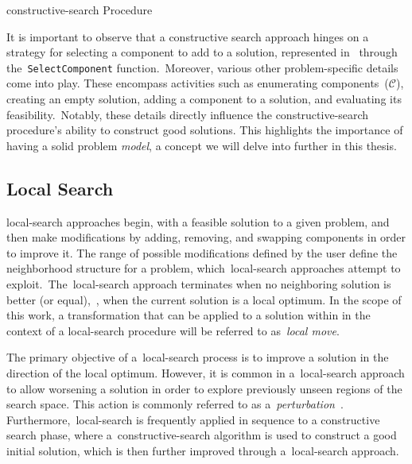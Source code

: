 \begin{algorithm}
  
  \caption{\acrlong{constructive-search} Procedure}
  \label{algorithm:cs}
\end{algorithm}

It is important to observe that a constructive search approach hinges on a
strategy for selecting a component to add to a solution, represented
in~ through the~\texttt{SelectComponent} function.~Moreover,
various other problem-specific details come into play. These encompass
activities such as enumerating components~($\mathcal{C}$), creating an empty solution, adding
a component to a solution, and evaluating its feasibility.~Notably, these details
directly influence the \acrshort{constructive-search} procedure's ability to
construct good solutions. This highlights the importance of having a solid
problem \textit{model}, a concept we will delve into further in this thesis.

\subsection{Local Search}
\label{subsec:local-search}

\acrfull{local-search} approaches begin, with a feasible solution to a given
problem, and then make modifications by adding, removing, and swapping
components in order to improve it. The range of possible modifications defined
by the user define the neighborhood structure for a problem,
which~\acrshort{local-search} approaches attempt to
exploit.~The~\acrshort{local-search} approach terminates when no neighboring
solution is better (or equal),~\ie{}, when the current solution is a local
optimum. In the scope of this work, a transformation that can be applied to a
solution within in the context of a \acrshort{local-search} procedure will be
referred to as~\textit{local move}.

The primary objective of a~\acrshort{local-search} process is to improve a
solution in the direction of the local optimum. However, it is common in
a~\acrshort{local-search} approach to allow worsening a solution in order to
explore previously unseen regions of the search space. This action is commonly
referred to as a~\textit{perturbation}~\cite{lourenco2010iterateda}.
Furthermore,~\acrshort{local-search} is frequently applied in sequence to a
constructive search phase, where a~\acrshort{constructive-search} algorithm is
used to construct a good initial solution, which is then further improved
through a~\acrshort{local-search} approach.

